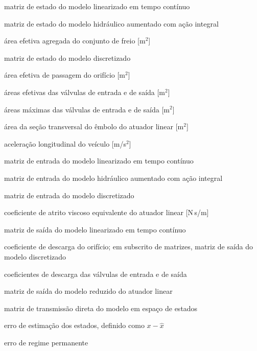 
\begin{simbolos}
\itemsep -1pt
    \item[$A$] matriz de estado do modelo linearizado em tempo contínuo
    \item[$A_a$] matriz de estado do modelo hidráulico aumentado com ação integral
    \item[$A_c$] área efetiva agregada do conjunto de freio [m$^2$]
    \item[$A_d$] matriz de estado do modelo discretizado
    \item[$A_{ef}$] área efetiva de passagem do orifício [m$^2$]
    \item[$A_{in}$, $A_{out}$] áreas efetivas das válvulas de entrada e de saída [m$^2$]
    \item[$A_{in,\max}$, $A_{out,\max}$] áreas máximas das válvulas de entrada e de saída [m$^2$]
    \item[$A_p$] área da seção transversal do êmbolo do atuador linear [m$^2$]
    \item[$a_{\mathrm{ego}}$] aceleração longitudinal do veículo [m/s$^2$]
    \item[$B$] matriz de entrada do modelo linearizado em tempo contínuo
    \item[$B_a$] matriz de entrada do modelo hidráulico aumentado com ação integral
    \item[$B_d$] matriz de entrada do modelo discretizado
    \item[$b_{eq}$] coeficiente de atrito viscoso equivalente do atuador linear [N\,s/m]
    \item[$C$] matriz de saída do modelo linearizado em tempo contínuo
    \item[$C_d$] coeficiente de descarga do orifício; em subscrito de matrizes, matriz de saída do modelo discretizado
    \item[$C_{d,in}$, $C_{d,out}$] coeficientes de descarga das válvulas de entrada e de saída
    \item[$C_x$] matriz de saída do modelo reduzido do atuador linear
    \item[$D$] matriz de transmissão direta do modelo em espaço de estados
    \item[$e$] erro de estimação dos estados, definido como $x-\hat{x}$
    \item[$e_\infty$] erro de regime permanente

\end{simbolos}
